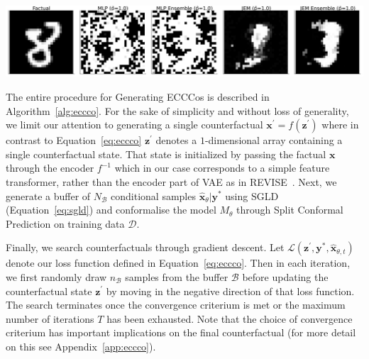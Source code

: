 \documentclass{article}
\begin{document}
\medskip

\begin{minipage}[c]{\textwidth}
  \includegraphics[width=\textwidth]{../artifacts/results/images/mnist_eccco.png}
  \label{fig:eccco-mnist}
\end{minipage}

\medskip

The entire procedure for Generating ECCCos is described in Algorithm~\ref{alg:eccco}. For the sake of simplicity and without loss of generality, we limit our attention to generating a single counterfactual $\mathbf{x}^\prime=f(\mathbf{z}^\prime)$ where in contrast to Equation~\ref{eq:eccco} $\mathbf{z}^\prime$ denotes a $1$-dimensional array containing a single counterfactual state. That state is initialized by passing the factual $\mathbf{x}$ through the encoder $f^{-1}$ which in our case corresponds to a simple feature transformer, rather than the encoder part of VAE as in REVISE~\citep{joshi2019realistic}. Next, we generate a buffer of $N_{\mathcal{B}}$ conditional samples $\hat{\mathbf{x}}_{\theta}|\mathbf{y}^*$ using SGLD (Equation~\ref{eq:sgld}) and conformalise the model $M_{\theta}$ through Split Conformal Prediction on training data $\mathcal{D}$.

Finally, we search counterfactuals through gradient descent. Let $\mathcal{L}(\mathbf{z}^\prime,\mathbf{y}^*,\hat{\mathbf{x}}_{\theta, t})$ denote our loss function defined in Equation~\ref{eq:eccco}. Then in each iteration, we first randomly draw $n_{\mathcal{B}}$ samples from the buffer $\mathcal{B}$ before updating the counterfactual state $\mathbf{z}^\prime$ by moving in the negative direction of that loss function. The search terminates once the convergence criterium is met or the maximum number of iterations $T$ has been exhausted. Note that the choice of convergence criterium has important implications on the final counterfactual (for more detail on this see Appendix~\ref{app:eccco}).
\end{document}
